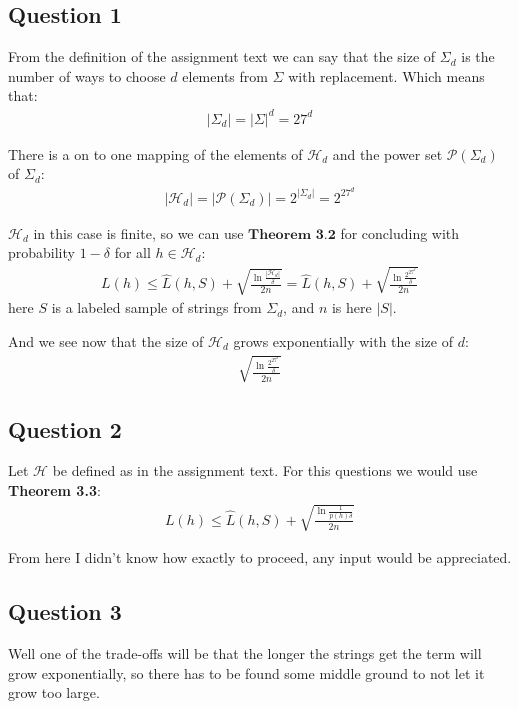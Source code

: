 \subsection{Question 1}
From the definition of the assignment text we can say that the size of $\Sigma_d$ is the number of ways to choose $d$ elements from $\Sigma$ with replacement.
Which means that:
\begin{align}
|\Sigma_d| = |\Sigma|^d = 27^d 
\end{align}

There is a on to one mapping of the elements of $\mathcal{H}_d$ and the power set $\mathcal{P}(\Sigma_d)$ of $\Sigma_d$:
\begin{align}
|\mathcal{H}_d| = |\mathcal{P}(\Sigma_d)| = 2^{|\Sigma_d|}=2^{27^d}
\end{align}

$\mathcal{H}_d$ in this case is finite, so we can use $\textbf{Theorem 3.2}$ for concluding with probability $1 - \delta$ for all $h \in \mathcal{H}_d$:
\begin{align}
L(h) \leq \hat{L}(h, S) + \sqrt{\frac{\ln \frac{|\mathcal{H}_d|}{\delta}}{2n}} = \hat{L}(h, S) + \sqrt{\frac{\ln \frac{2^{27^d}}{\delta}}{2n}}
\end{align}
here $S$ is a labeled sample of strings from $\Sigma_d$, and $n$ is here $|S|$.


And we see now that the size of $\mathcal{H}_d$ grows exponentially with the size of $d$:
\begin{align}
\sqrt{\frac{\ln \frac{2^{27^d}}{\delta}}{2n}}
\end{align}

\subsection{Question 2}
Let $\mathcal{H}$ be defined as in the assignment text. 
For this questions we would use \textbf{Theorem 3.3}:
\begin{align}
L(h) \leq \hat{L}(h,S) + \sqrt{\frac{\ln \frac{1}{p(h)\delta}}{2n}}
\end{align}

From here I didn't know how exactly to proceed, any input would be appreciated. 


\subsection{Question 3}
Well one of the trade-offs will be that the longer the strings get the term will grow exponentially, so there has to be found some middle ground to not let it grow too large.
